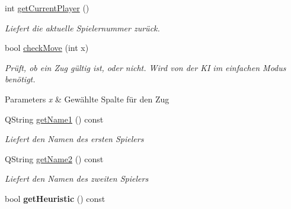 \begin{DoxyCompactItemize}
\item 
int \hyperlink{class_connect_four_a9b4b647139235c7c3eae2c5c9c8d7471}{get\-Current\-Player} ()
\begin{DoxyCompactList}\small\item\em Liefert die aktuelle Spielernummer zurück. \end{DoxyCompactList}\item 
bool \hyperlink{class_connect_four_ad00b3add13aac59b6dc6469cb24c7d53}{check\-Move} (int x)
\begin{DoxyCompactList}\small\item\em Prüft, ob ein Zug gültig ist, oder nicht. Wird von der K\-I im einfachen Modus benötigt. 
\begin{DoxyParams}{Parameters}
{\em x} & Gewählte Spalte für den Zug\\
\hline
\end{DoxyParams}
\end{DoxyCompactList}\item 
Q\-String \hyperlink{class_connect_four_a0fb31ff9df21241727dc89111a8237d1}{get\-Name1} () const 
\begin{DoxyCompactList}\small\item\em Liefert den Namen des ersten Spielers \end{DoxyCompactList}\item 
Q\-String \hyperlink{class_connect_four_af1e622aabf4ab9c3e59f120453b4b00a}{get\-Name2} () const 
\begin{DoxyCompactList}\small\item\em Liefert den Namen des zweiten Spielers \end{DoxyCompactList}\item 
\hypertarget{class_connect_four_a1ee5735fdac151d7f11fec3daeeef6fc}{bool {\bfseries get\-Heuristic} () const }\label{class_connect_four_a1ee5735fdac151d7f11fec3daeeef6fc}


\end{DoxyCompactItemize}
